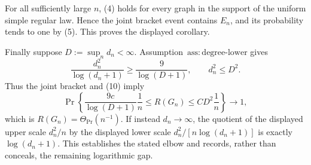 For all sufficiently large \(n\), (4) holds for every graph in the support of the uniform simple regular law.  Hence the joint bracket event contains \(E_n\), and its probability tends to one by (5).  This proves the displayed corollary.

Finally suppose \(D:=\sup_n d_n<\infty\).  Assumption~\(\mathrm{ass{:}degree\mbox{-}lower}\) gives
\[
\frac{d_n^2}{\log(d_n+1)}\ge\frac{9}{\log(D+1)},
\qquad
d_n^2\le D^2.
\tag{10}
\]
Thus the joint bracket and (10) imply
\[
\Pr\!\left\{
\frac{9c}{\log(D+1)}\frac1n
\le R(G_n)\le
CD^2\frac1n
\right\}\longrightarrow1,
\tag{11}
\]
which is \(R(G_n)=\Theta_{\Pr}(n^{-1})\).  If instead \(d_n\to\infty\), the quotient of the displayed upper scale \(d_n^2/n\) by the displayed lower scale \(d_n^2/[n\log(d_n+1)]\) is exactly \(\log(d_n+1)\).  This establishes the stated elbow and records, rather than conceals, the remaining logarithmic gap.
